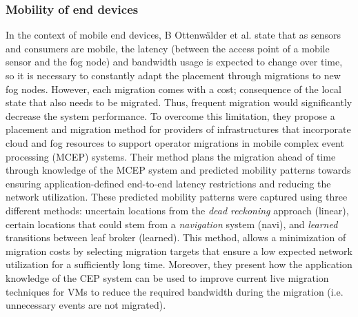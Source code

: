 \subsubsection{Mobility of end devices}
\noindent\tab In the context of mobile end devices, B Ottenwälder et al. \cite{ottenwalder2013migcep} state that as sensors and consumers are mobile, the latency (between the access point of a mobile sensor and the fog node) and bandwidth usage is expected to change over time, so it is necessary to constantly adapt the placement through migrations to new fog nodes. However, each migration comes with a cost; consequence of the local state that also needs to be migrated. Thus, frequent migration would significantly decrease the system performance. To overcome this limitation, they propose a placement and migration method for providers of infrastructures that incorporate cloud and fog resources to support operator migrations in mobile complex event processing (MCEP) systems. Their method plans the migration ahead of time through knowledge of the MCEP system and predicted mobility patterns towards ensuring application-defined end-to-end latency restrictions and reducing the network utilization. These predicted mobility patterns were captured using three different methods: uncertain locations from the \textit{dead reckoning} approach (linear), certain locations that could stem from a \textit{navigation} system (navi), and \textit{learned} transitions between leaf broker (learned). This method, allows a minimization of migration costs by selecting migration targets that ensure a low expected network utilization for a sufficiently long time. Moreover, they present how the application knowledge of the CEP system can be used to improve current live migration techniques for VMs to reduce the required bandwidth during the migration (i.e. unnecessary events are not migrated).\\

